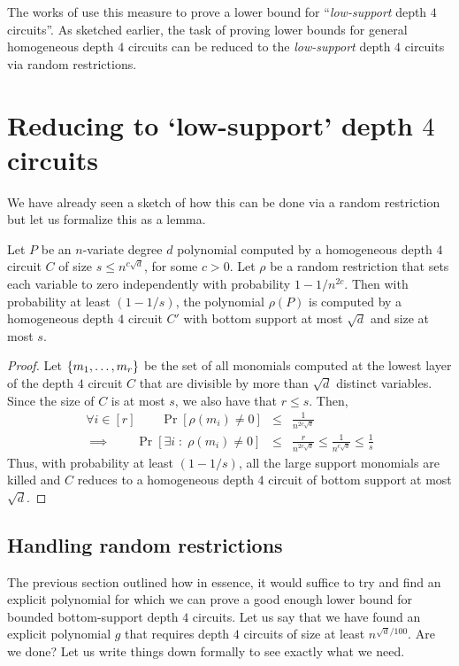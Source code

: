 The works of \cite{KLSS,KS14} use this measure to prove a lower bound for ``\emph{low-support} depth $4$ circuits''. As sketched earlier, the task of proving lower bounds for general homogeneous depth $4$ circuits can be reduced to the \emph{low-support} depth $4$ circuits via random restrictions. 

\section{Reducing to `low-support' depth $4$ circuits}\label{sec:red-to-low-support}

We have already seen a sketch of how this can be done via a random restriction but let us formalize this as a lemma. 

\begin{lemma}\label{lem:red-to-low-supp}
Let $P$ be an $n$-variate degree $d$ polynomial computed by a homogeneous depth $4$ circuit $C$ of size $s \leq n^{c\sqrt{d}}$, for some $c>0$. Let $\rho$ be a random restriction that sets each variable to zero independently with probability $1 - 1/n^{2c}$. Then with probability at least $(1 - 1/s)$, the polynomial $\rho(P)$ is computed by a homogeneous depth $4$ circuit $C'$ with bottom support at most $\sqrt{d}$ and size at most $s$. 
\end{lemma}
\begin{proof}
Let $\left\{m_1,\dots, m_r\right\}$ be the set of all monomials computed at the lowest layer of the depth $4$ circuit $C$ that are divisible by more than $\sqrt{d}$ distinct variables. Since the size of $C$ is at most $s$, we also have that $r\leq s$. Then,
\begin{eqnarray*}
\forall i\in [r] \qquad \Pr[\rho(m_i) \neq 0] & \leq & \frac{1}{n^{2c\sqrt{d}}}\\
\implies \qquad \Pr[\exists i \;:\; \rho(m_i) \neq 0] & \leq & \frac{r}{n^{2c\sqrt{d}}} \leq \frac{1}{n^{c\sqrt{d}}} \leq \frac{1}{s}
\end{eqnarray*}
Thus, with probability at least $(1 - 1/s)$, all the large support monomials are killed and $C$ reduces to a homogeneous depth $4$ circuit of bottom support at most $\sqrt{d}$. 
\end{proof}

\subsection{Handling random restrictions}

The previous section outlined how in essence, it would suffice to try and find an explicit polynomial for which we can prove a good enough lower bound for bounded bottom-support depth $4$ circuits. Let us say that we have found an explicit polynomial $g$ that requires depth $4$ circuits of size at least $n^{\sqrt{d}/100}$. Are we done? Let us write things down formally to see exactly what we need. 

